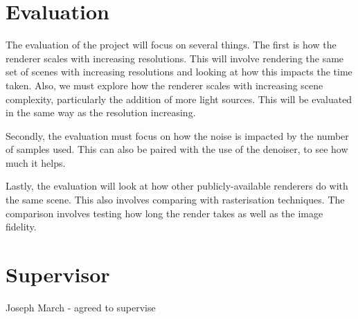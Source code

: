 \documentclass[12pt, a4paper]{article}
\begin{document}
    \section*{Evaluation}
    The evaluation of the project will focus on several things. The first is how the renderer scales with increasing resolutions. This will involve rendering the same set of scenes with increasing resolutions and looking at how this impacts the time taken. Also, we must explore how the renderer scales with increasing scene complexity, particularly the addition of more light sources. This will be evaluated in the same way as the resolution increasing.

    Secondly, the evaluation must focus on how the noise is impacted by the number of samples used. This can also be paired with the use of the denoiser, to see how much it helps.

    Lastly, the evaluation will look at how other publicly-available renderers do with the same scene. This also involves comparing with rasterisation techniques. The comparison involves testing how long the render takes as well as the image fidelity.

    \section*{Supervisor}
    Joseph March - agreed to supervise
\end{document}
